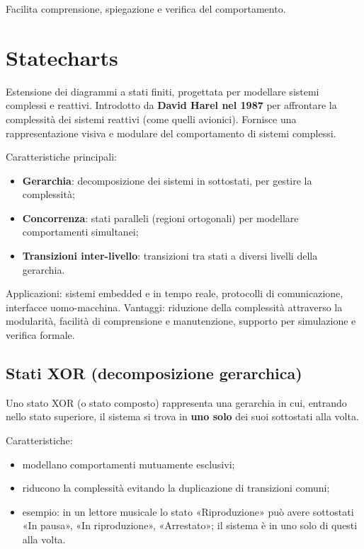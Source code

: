Facilita comprensione, spiegazione e verifica del comportamento.

\section{Statecharts}
\begin{defn}[Statechart]
Estensione dei diagrammi a stati finiti, progettata per modellare sistemi complessi e reattivi. Introdotto da \textbf{David Harel nel 1987} per affrontare la complessità dei sistemi reattivi (come quelli avionici). Fornisce una rappresentazione visiva e modulare del comportamento di sistemi complessi.
\end{defn}

Caratteristiche principali:
\begin{itemize}
    \item \textbf{Gerarchia}: decomposizione dei sistemi in sottostati, per gestire la complessità;
    \item \textbf{Concorrenza}: stati paralleli (regioni ortogonali) per modellare comportamenti simultanei;
    \item \textbf{Transizioni inter-livello}: transizioni tra stati a diversi livelli della gerarchia.
\end{itemize}

Applicazioni: sistemi embedded e in tempo reale, protocolli di comunicazione, interfacce uomo-macchina. Vantaggi: riduzione della complessità attraverso la modularità, facilità di comprensione e manutenzione, supporto per simulazione e verifica formale.

\subsection{Stati XOR (decomposizione gerarchica)}
\begin{defn}
Uno stato XOR (o stato composto) rappresenta una gerarchia in cui, entrando nello stato superiore, il sistema si trova in \textbf{uno solo} dei suoi sottostati alla volta.
\end{defn}
Caratteristiche:
\begin{itemize}
    \item modellano comportamenti mutuamente esclusivi;
    \item riducono la complessità evitando la duplicazione di transizioni comuni;
    \item esempio: in un lettore musicale lo stato «Riproduzione» può avere sottostati «In pausa», «In riproduzione», «Arrestato»; il sistema è in uno solo di questi alla volta.
\end{itemize}

